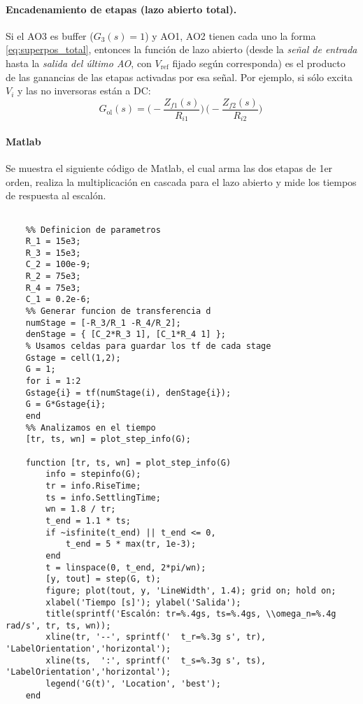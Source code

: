 \paragraph{Encadenamiento de etapas (lazo abierto total).}
Si el AO3 es buffer ($G_3(s)=1$) y AO1, AO2 tienen cada uno la forma \eqref{eq:superpos_total}, entonces la función de lazo abierto (desde la \emph{señal de entrada} hasta la \emph{salida del último AO}, con $V_{\text{ref}}$ fijado según corresponda) es el producto de las ganancias de las etapas activadas por esa señal. Por ejemplo, si sólo excita $V_i$ y las no inversoras están a DC:
\[
G_{\text{ol}}(s)
= \Big(-\frac{Z_{f1}(s)}{R_{i1}}\Big)\,
\Big(-\frac{Z_{f2}(s)}{R_{i2}}\Big)\
\]
\paragraph{Matlab} Se muestra el siguiente código de Matlab, el cual arma las dos etapas de 1er orden, realiza la multiplicación en cascada para el lazo abierto y mide los tiempos de respuesta al escalón.

\onecolumn

\begin{lstlisting}[style=matlabstyle,caption={Script en Matlab},label={lst:mat}]
	
	%% Definicion de parametros
	R_1 = 15e3;
	R_3 = 15e3;
	C_2 = 100e-9;
	R_2 = 75e3;
	R_4 = 75e3;
	C_1 = 0.2e-6;
	%% Generar funcion de transferencia d
	numStage = [-R_3/R_1 -R_4/R_2];
	denStage = { [C_2*R_3 1], [C_1*R_4 1] };
	% Usamos celdas para guardar los tf de cada stage
	Gstage = cell(1,2);
	G = 1;
	for i = 1:2
	Gstage{i} = tf(numStage(i), denStage{i});
	G = G*Gstage{i};
	end
	%% Analizamos en el tiempo
	[tr, ts, wn] = plot_step_info(G);
	
	function [tr, ts, wn] = plot_step_info(G)
		info = stepinfo(G);
		tr = info.RiseTime;
		ts = info.SettlingTime;
		wn = 1.8 / tr;
		t_end = 1.1 * ts;
		if ~isfinite(t_end) || t_end <= 0, 
			t_end = 5 * max(tr, 1e-3); 
		end
		t = linspace(0, t_end, 2*pi/wn);
		[y, tout] = step(G, t);
		figure; plot(tout, y, 'LineWidth', 1.4); grid on; hold on;
		xlabel('Tiempo [s]'); ylabel('Salida');
		title(sprintf('Escalón: tr=%.4gs, ts=%.4gs, \\omega_n=%.4g rad/s', tr, ts, wn));
		xline(tr, '--', sprintf('  t_r=%.3g s', tr), 'LabelOrientation','horizontal');
		xline(ts,  ':', sprintf('  t_s=%.3g s', ts), 'LabelOrientation','horizontal');
		legend('G(t)', 'Location', 'best');
	end
	
\end{lstlisting}
\twocolumn
{}
